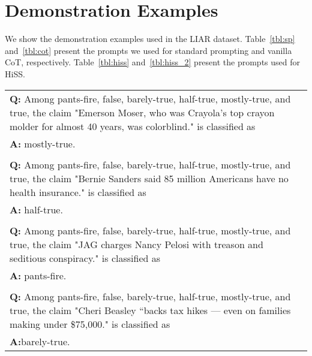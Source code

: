 \documentclass[11pt]{article}
\begin{document}
\section{Demonstration Examples}
\label{app:prompt}
We show the demonstration examples used in the LIAR dataset.
Table~\ref{tbl:sp} and~\ref{tbl:cot} present the prompts we used for standard prompting and vanilla CoT, respectively. Table~\ref{tbl:hiss} and~\ref{tbl:hiss_2} present the prompts used for HiSS.

\begin{table*}[t!]
\centering
\small
\begin{tabular}{p{15cm}}
\toprule
\textbf{Q:}
Among pants-fire, false, barely-true, half-true, mostly-true, and true, the claim "Emerson Moser, who was Crayola’s top crayon molder for almost 40 years, was colorblind." is classified as \\
\textbf{A:}
mostly-true.\\\\
\textbf{Q:}
Among pants-fire, false, barely-true, half-true, mostly-true, and true, the claim "Bernie Sanders said 85 million Americans have no health insurance." is classified as \\
\textbf{A:}
half-true.\\\\
\textbf{Q:}
Among pants-fire, false, barely-true, half-true, mostly-true, and true, the claim "JAG charges Nancy Pelosi with treason and seditious conspiracy." is classified as \\
\textbf{A:}
pants-fire.\\\\
\textbf{Q:}
Among pants-fire, false, barely-true, half-true, mostly-true, and true, the claim "Cheri Beasley “backs tax hikes — even on families making under \$75,000." is classified as \\\textbf{A:}barely-true.\\
\bottomrule

\end{tabular}
\caption{Demonstration examples of standard prompting.  }
\label{tbl:sp}

\end{table*}
\end{document}
